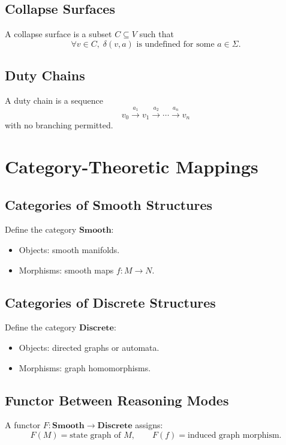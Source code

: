 \documentclass[12pt]{article}
\begin{document}
\subsection{Collapse Surfaces}
A collapse surface is a subset $C \subseteq V$ such that
\[
\forall v \in C,\; \delta(v, a) \text{ is undefined for some } a \in \Sigma.
\]

\subsection{Duty Chains}
A duty chain is a sequence
\[
v_0 \xrightarrow{a_1} v_1 \xrightarrow{a_2} \cdots \xrightarrow{a_n} v_n
\]
with no branching permitted.


\section{Category-Theoretic Mappings}

\subsection{Categories of Smooth Structures}
Define the category $\mathbf{Smooth}$:
\begin{itemize}
    \item Objects: smooth manifolds.
    \item Morphisms: smooth maps $f : M \to N$.
\end{itemize}

\subsection{Categories of Discrete Structures}
Define the category $\mathbf{Discrete}$:
\begin{itemize}
    \item Objects: directed graphs or automata.
    \item Morphisms: graph homomorphisms.
\end{itemize}

\subsection{Functor Between Reasoning Modes}
A functor $F : \mathbf{Smooth} \to \mathbf{Discrete}$ assigns:
\[
F(M) = \text{state graph of } M,
\qquad
F(f) = \text{induced graph morphism}.
\]
\end{document}
